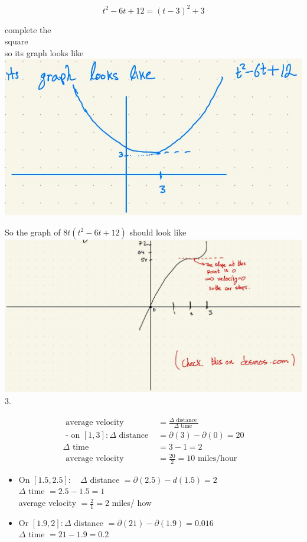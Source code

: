 \documentclass[10pt]{article}
\begin{document}
$$
t^{2}-6 t+12=(t-3)^{2}+3
$$

complete the\\
square\\
so its graph looks like\\
\includegraphics[max width=\textwidth, center]{2024_12_26_646789e1ccd1e87aeca8g-03}

So the graph of $8 t\left(t^{2}-6 t+12\right)$ should look like\\
\includegraphics[max width=\textwidth, center]{2024_12_26_646789e1ccd1e87aeca8g-03(1)}\\
3.

$$
\begin{aligned}
\text { average velocity } & =\frac{\Delta \text { distance }}{\Delta \text { time }} \\
\text { - on }[1,3]: \Delta \text { distance } & =\partial(3)-\partial(0)=20 \\
\Delta \text { time } & =3-1=2 \\
\text { average velocity } & =\frac{20}{2}=10 \text { miles/hour }
\end{aligned}
$$

\begin{itemize}
  \item On $[1.5,2.5]: \quad \Delta$ distance $=\partial(2.5)-d(1.5)=2$\\
$\Delta$ time $=2.5-1.5=1$\\
average velocity $=\frac{2}{1}=2$ miles/ how
  \item Or $[1.9,2]: \Delta$ distance $=\partial(21)-\partial(1.9)=0.016$\\
$\Delta$ time $=21-1.9=0.2$
\end{itemize}
\end{document}
